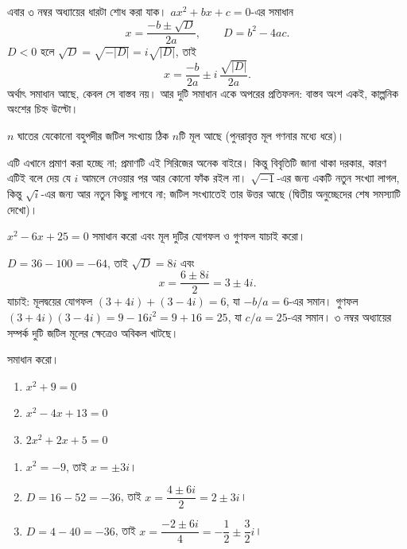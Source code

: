 \documentclass[11pt]{article}
\begin{document}
এবার ৩ নম্বর অধ্যায়ের ধারটা শোধ করা যাক। $ax^{2}+bx+c = 0$-এর সমাধান
\[
  x = \frac{-b \pm \sqrt{D}}{2a}, \qquad D = b^{2}-4ac .
\]
$D < 0$ হলে $\sqrt{D} = \sqrt{-|D|} = i\sqrt{|D|}$, তাই
\[
  x = \frac{-b}{2a} \pm i\,\frac{\sqrt{|D|}}{2a} .
\]
অর্থাৎ সমাধান আছে, কেবল সে বাস্তব নয়। আর দুটি সমাধান একে অপরের প্রতিফলন:
বাস্তব অংশ একই, কাল্পনিক অংশের চিহ্ন উল্টো।

\begin{idea}
$n$ ঘাতের যেকোনো বহুপদীর জটিল সংখ্যায় ঠিক $n$টি মূল আছে (পুনরাবৃত্ত মূল
গণনার মধ্যে ধরে)।
\end{idea}

এটি এখানে প্রমাণ করা হচ্ছে না; প্রমাণটি এই সিরিজের অনেক বাইরে। কিন্তু বিবৃতিটি
জানা থাকা দরকার, কারণ এটিই বলে দেয় যে $i$ আমলে নেওয়ার পর আর কোনো ফাঁক রইল না।
$\sqrt{-1}$-এর জন্য একটি নতুন সংখ্যা লাগল, কিন্তু $\sqrt{i}$-এর জন্য আর নতুন
কিছু লাগবে না; জটিল সংখ্যাতেই তার উত্তর আছে (দ্বিতীয় অনুচ্ছেদের শেষ সমস্যাটি
দেখো)।

\begin{example}
$x^{2} - 6x + 25 = 0$ সমাধান করো এবং মূল দুটির যোগফল ও গুণফল যাচাই করো।
\end{example}

\begin{solbox}
$D = 36 - 100 = -64$, তাই $\sqrt{D} = 8i$ এবং
\[
  x = \frac{6 \pm 8i}{2} = 3 \pm 4i .
\]
যাচাই: মূলদ্বয়ের যোগফল $(3+4i)+(3-4i) = 6$, যা $-b/a = 6$-এর সমান। গুণফল
$(3+4i)(3-4i) = 9 - 16i^{2} = 9+16 = 25$, যা $c/a = 25$-এর সমান। ৩ নম্বর
অধ্যায়ের সম্পর্ক দুটি জটিল মূলের ক্ষেত্রেও অবিকল খাটছে।
\end{solbox}

 সমাধান করো।
\begin{enumerate}
  \item $x^{2}+9 = 0$
  \item $x^{2}-4x+13 = 0$
  \item $2x^{2}+2x+5 = 0$
\end{enumerate}

\begin{sol}
\begin{enumerate}
  \item $x^{2} = -9$, তাই $x = \pm 3i$।
  \item $D = 16-52 = -36$, তাই $x = \dfrac{4 \pm 6i}{2} = 2 \pm 3i$।
  \item $D = 4-40 = -36$, তাই
        $x = \dfrac{-2 \pm 6i}{4} = -\dfrac{1}{2} \pm \dfrac{3}{2}i$।
\end{enumerate}
\end{sol}
\end{document}

